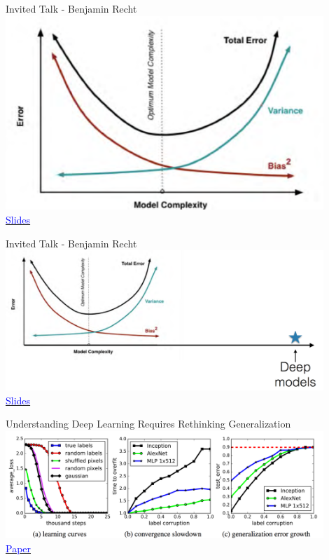 \documentclass[]{beamer}
\begin{document}
\begin{frame}{Invited Talk - Benjamin Recht}
\centering
\includegraphics[width=0.9\textwidth]{figures/recht-bias-variance} \\
\href{http://iclr.cc/lib/exe/fetch.php?media=iclr2017:recht\_iclr2017.pdf}{\textcolor{blue}{Slides}}
\end{frame}

\begin{frame}{Invited Talk - Benjamin Recht}
\centering
\includegraphics[width=0.9\textwidth]{figures/recht-bias-variance-conundrum} \\
\href{http://iclr.cc/lib/exe/fetch.php?media=iclr2017:recht\_iclr2017.pdf}{\textcolor{blue}{Slides}}
\end{frame}

\begin{frame}{Understanding Deep Learning Requires Rethinking Generalization}
\centering
\includegraphics[width=0.9\textwidth]{figures/zhang-learning-curves} \\
\href{http://openreview.net/forum?id=Sy8gdB9xx}{\textcolor{blue}{Paper}}
\end{frame}
\end{document}
